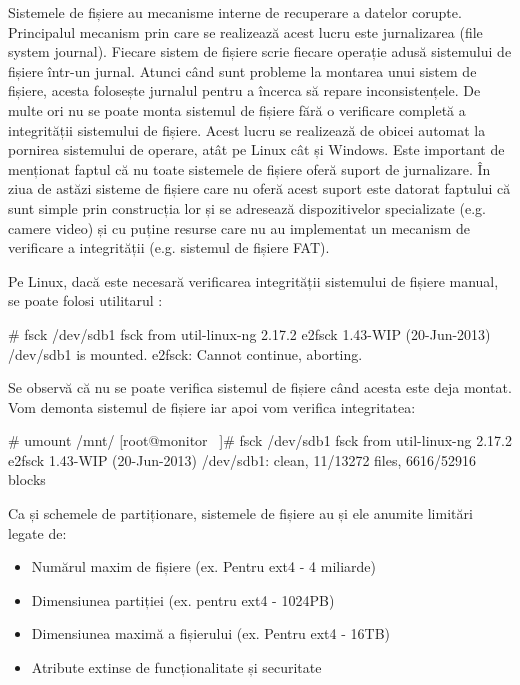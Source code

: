 Sistemele de fișiere au mecanisme interne de recuperare a datelor corupte.
Principalul mecanism prin care se realizează acest lucru este jurnalizarea (file
system journal). Fiecare sistem de fișiere scrie fiecare operație adusă
sistemului de fișiere într-un jurnal. Atunci când sunt probleme la montarea unui
sistem de fișiere, acesta folosește jurnalul pentru a încerca să repare
inconsistențele. De multe ori nu se poate monta sistemul de fișiere fără o
verificare completă a integrității sistemului de fișiere. Acest lucru se
realizează de obicei automat la pornirea sistemului de operare, atât pe Linux
cât și Windows. Este important de menționat faptul că nu toate sistemele de
fișiere oferă suport de jurnalizare. În ziua de astăzi sisteme de fișiere care
nu oferă acest suport este datorat faptului că sunt simple prin construcția lor
și se adresează dispozitivelor specializate (e.g. camere video) și cu puține
resurse care nu au implementat un mecanism de verificare a integrității (e.g.
sistemul de fișiere FAT).

Pe Linux, dacă este necesară verificarea integrității sistemului de fișiere
manual, se poate folosi utilitarul :

\begin{screen}
# fsck /dev/sdb1
fsck from util-linux-ng 2.17.2
e2fsck 1.43-WIP (20-Jun-2013)
/dev/sdb1 is mounted.
e2fsck: Cannot continue, aborting.
\end{screen}

Se observă că nu se poate verifica sistemul de fișiere când acesta este deja
montat. Vom demonta sistemul de fișiere iar apoi vom verifica integritatea:

\begin{screen}
# umount /mnt/
[root@monitor ~]# fsck /dev/sdb1
fsck from util-linux-ng 2.17.2
e2fsck 1.43-WIP (20-Jun-2013)
/dev/sdb1: clean, 11/13272 files, 6616/52916 blocks
\end{screen}

Ca și schemele de partiționare, sistemele de fișiere au și ele anumite limitări
legate de:

\begin{itemize}
	\item Numărul maxim de fișiere (ex. Pentru ext4 - 4 miliarde)
	\item Dimensiunea partiției (ex. pentru ext4 - 1024PB)
	\item Dimensiunea maximă a fișierului (ex. Pentru ext4 - 16TB)
	\item Atribute extinse de funcționalitate și securitate
\end{itemize}

